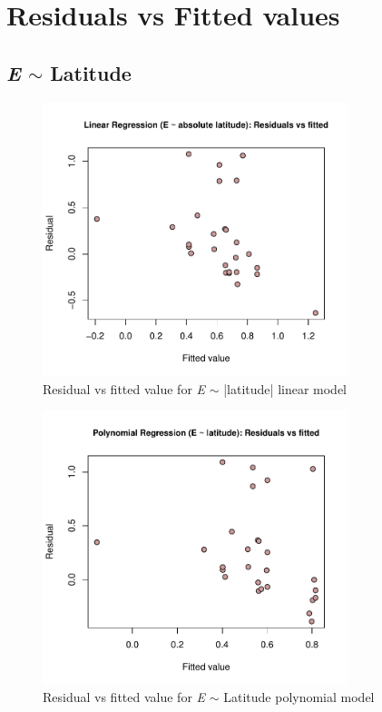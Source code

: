 \documentclass{article}
\begin{document}
\section{Residuals vs Fitted values}
\subsection{\emph{E} $\sim$ Latitude}
\begin{figure}[h]
    \centering
    \includegraphics[width=3.5in]{Lat_lin_rs.pdf}
    \caption{\label{fig:S5} Residual vs fitted value for \emph{E} $\sim$ |latitude| linear model}
\end{figure}
\begin{figure}[h]
    \centering
    \includegraphics[width=3.5in]{Lat_poly_rs.pdf}
    \caption{\label{fig:S6} Residual vs fitted value for \emph{E} $\sim$ Latitude polynomial model}
\end{figure}
\clearpage
\end{document}
